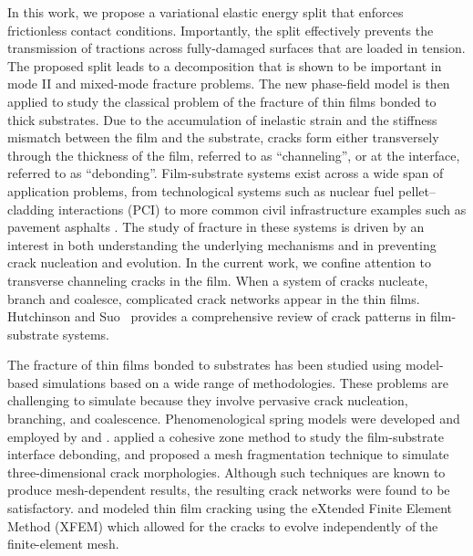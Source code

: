 In this work, we propose a variational elastic energy split that enforces frictionless contact conditions.  Importantly, the split effectively prevents the transmission of tractions across fully-damaged surfaces that are loaded in tension.
The proposed split leads to a decomposition that is shown to be important in mode II and mixed-mode fracture problems.
The new phase-field model is then applied to study the classical problem of the fracture of thin films bonded to thick substrates.  Due to the accumulation of inelastic strain and the stiffness mismatch between the film and the substrate, cracks form either transversely through the thickness of the film, referred to as ``channeling'', or at the interface, referred to as ``debonding''.  Film-substrate systems exist across a wide span of application problems, from technological systems such as nuclear fuel pellet--cladding interactions (PCI) \cite{roberts1977pellet, michel20083d, jernkvist1995model, nagase2004effect, billone2008cladding}
to more common civil infrastructure examples such as pavement asphalts \cite{el2005calibration, el2009methodology, saar2010automatic, button2007guidelines, yildirim2006field}.
The study of fracture in these systems is driven by an interest in both understanding the underlying mechanisms and in preventing crack nucleation and evolution.  In the current work, we confine attention to transverse channeling cracks in the film.  When a system of cracks nucleate, branch and coalesce, complicated crack networks appear in the thin films. Hutchinson and Suo~\cite{hutchinson1991mixed} provides a
comprehensive review of crack patterns in film-substrate systems.

The fracture of thin films bonded to substrates has been studied using model-based simulations based on a wide range of methodologies.  These problems are challenging to simulate because they involve pervasive crack nucleation, branching, and coalescence.   Phenomenological spring models were developed and employed by \citet{crosby1997fragmentation, leung2000pattern} and \citet{ sadhukhan2011crack}. \citet{zhang2017modeling} applied a cohesive zone method to study the film-substrate interface debonding, and \citet{sanchez2014modeling}
proposed a mesh fragmentation technique to simulate three-dimensional crack morphologies. Although such techniques are known to produce mesh-dependent results, the resulting crack networks were found to be satisfactory. \citet{liang2003evolving, sukumar2003modeling} and \citet{huang2003modeling} modeled thin film cracking using the eXtended Finite Element Method (XFEM) which allowed for the cracks to evolve independently of the finite-element mesh.

